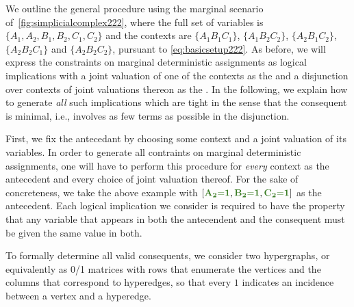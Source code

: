 {We outline the general procedure using 
the marginal scenario of~\cref{fig:simplicialcomplex222}, where the full set of variables is $\{ A_1, A_2, B_1, B_2, C_1, C_2\}$ and the contexts are $\{A_1 B_1 C_1\}$, $\{A_1 B_2 C_2\}$, $\{A_2 B_1 C_2\}$, $\{A_2 B_2 C_1\}$ and $\{A_2 B_2 C_2\}$, pursuant to \cref{eq:basicsetup222}.
As before, we will express the constraints on marginal deterministic assignments as logical implications with
a joint valuation of one of the contexts as the  and a disjunction over contexts of joint valuations thereon as the . In the following, we explain how to generate \emph{all} such implications which are tight in the sense that the consequent is minimal, i.e., involves as few terms as possible in the disjunction. 

First, we fix the antecedant by choosing some context and a joint valuation of its variables. In order to generate all contraints on marginal deterministic assignments, one will have to perform this procedure for \emph{every} context as the antecedent and every choice of joint valuation thereof. For the sake of concreteness, we take the above example with $\bracks{\mgreen{A_2 \eql 1}, \mgreen{B_2 \eql 1}, \mgreen{C_2 \eql 1}}$ as the antecedent.  
Each logical implication we consider is required to have the property 
 that any variable that appears in both the antecendent and the consequent must be given the same value in both. 

To formally determine all valid consequents, we consider two hypergraphs, or equivalently as 0/1 matrices with rows that enumerate the vertices and the columns that correspond to hyperedges, so that every $1$ indicates an incidence between a vertex and a hyperedge. %

}
